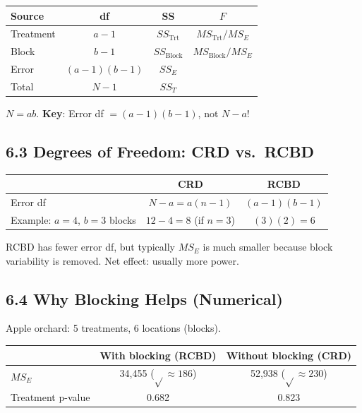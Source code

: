 \documentclass[9pt,letterpaper]{article}
\begin{document}
\begin{center}\small
\begin{tabular}{@{}lccc@{}}
\toprule
Source & df & SS & $F$ \\
\midrule
Treatment & $a-1$ & $SS_{\text{Trt}}$ & $MS_{\text{Trt}}/MS_E$ \\
Block & $b-1$ & $SS_{\text{Block}}$ & $MS_{\text{Block}}/MS_E$ \\
Error & $(a-1)(b-1)$ & $SS_E$ & \\
Total & $N-1$ & $SS_T$ & \\
\bottomrule
\end{tabular}
\end{center}

$N=ab$. \textbf{Key}: Error df $= (a-1)(b-1)$, not $N-a$!

\subsection{6.3 Degrees of Freedom: CRD vs.\ RCBD}

\begin{center}\small
\begin{tabular}{@{}lcc@{}}
\toprule
 & \textbf{CRD} & \textbf{RCBD} \\
\midrule
Error df & $N - a = a(n-1)$ & $(a-1)(b-1)$ \\
Example: $a=4$, $b=3$ blocks & $12 - 4 = 8$ (if $n=3$) & $(3)(2) = 6$ \\
\bottomrule
\end{tabular}
\end{center}

RCBD has fewer error df, but typically $MS_E$ is much smaller because block variability is removed. Net effect: usually more power.

\subsection{6.4 Why Blocking Helps (Numerical)}

Apple orchard: 5 treatments, 6 locations (blocks).

\begin{center}\small
\begin{tabular}{@{}lcc@{}}
\toprule
 & With blocking (RCBD) & Without blocking (CRD) \\
\midrule
$MS_E$ & 34,455 ($\sqrt{}\approx 186$) & 52,938 ($\sqrt{}\approx 230$) \\
Treatment p-value & 0.682 & 0.823 \\
\bottomrule
\end{tabular}
\end{center}
\end{document}
